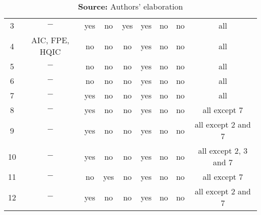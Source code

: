 \begin{table}[]
{\begin{tabular}{c|c|c|c|c|c|c|c|c}
3  & $-$            & yes & no                 & yes            & yes & no                 & no             & all                   \\
4  & AIC, FPE, HQIC & no  & no                 & no             & yes & no                 & no             & all                   \\
5  & $-$            & no  & no                 & no             & yes & no                 & no             & all                   \\
6  & $-$            & no  & no                 & no             & yes & no                 & no             & all                   \\
7  & $-$            & yes & no                 & no             & yes & no                 & no             & all                   \\
8  & $-$            & yes & no                 & no             & yes & no                 & no             & all except 7          \\
9  & $-$            & yes & no                 & no             & yes & no                 & no             & all except 2 and 7    \\
10 & $-$            & yes & no                 & no             & yes & no                 & no             & all except 2, 3 and 7 \\
11 & $-$            & no  & yes                & no             & yes & no                 & no             & all except 7          \\
12 & $-$            & yes & no                 & no             & yes & no                 & no             & all except 2 and 7    \\ \hline\hline
\end{tabular}%
}
\caption*{\textbf{Source:} Authors' elaboration}
\end{table}